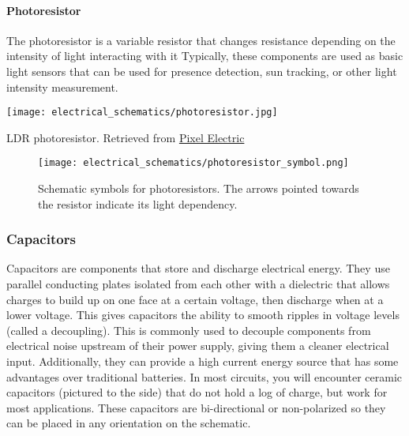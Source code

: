         \paragraph*{Photoresistor}
        The photoresistor is a variable resistor that changes resistance depending on the intensity of light interacting with it
        Typically, these components are used as basic light sensors that can be used for presence detection, sun tracking, or other light intensity measurement.

        \begin{marginfigure}[-1in]
            \texttt{[image: electrical\_schematics/photoresistor.jpg]}
            \caption{LDR photoresistor.
            Retrieved from \href{https://www.pixelelectric.com/sensors/light-sound/light-color-sensor/5528-ldr-mini-photoresistor/}{Pixel Electric}}
        \end{marginfigure}

        \begin{figure}[h!]
            \texttt{[image: electrical\_schematics/photoresistor\_symbol.png]}
            \caption[Potentiometer Symbol]{Schematic symbols for photoresistors. The arrows pointed towards the resistor indicate its light dependency.}
        \end{figure}

        \subsubsection*{Capacitors}
        Capacitors are components that store and discharge electrical energy.
        They use parallel conducting plates isolated from each other with a dielectric that allows charges to build up on one face at a certain voltage, then discharge when at a lower voltage.
        This gives capacitors the ability to smooth ripples in voltage levels (called a decoupling).
        This is commonly used to decouple components from electrical noise upstream of their power supply, giving them a cleaner electrical input.
        Additionally, they can provide a high current energy source that has some advantages over traditional batteries.
        In most circuits, you will encounter ceramic capacitors (pictured to the side) that do not hold a log of charge, but work for most applications.
        These capacitors are bi-directional or non-polarized so they can be placed in any orientation on the schematic.

